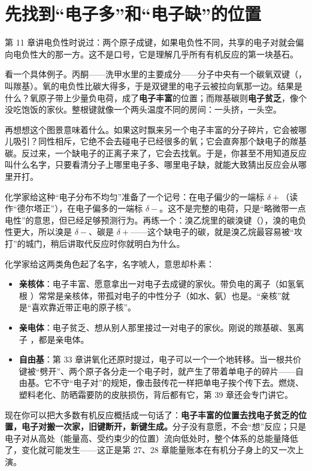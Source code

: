 \section{先找到“电子多”和“电子缺”的位置}

第 11 章讲电负性时说过：两个原子成键，如果电负性不同，共享的电子对就会偏向电负性大的那一方。这不是口号，它是理解几乎所有有机反应的第一块基石。

看一个具体例子。丙酮——洗甲水里的主要成分——分子中央有一个碳氧双键（，叫羰基）。氧的电负性比碳大得多，于是双键里的电子云被拉向氧那一边。结果是什么？氧原子带上少量负电荷，成了\textbf{电子丰富}的位置；而羰基碳则\textbf{电子贫乏}，像个没吃饱饭的家伙。整根键就像一个两头温度不同的房间：一头挤，一头空。

再想想这个图景意味着什么。如果这时飘来另一个电子丰富的分子碎片，它会被哪儿吸引？同性相斥，它绝不会去碰电子已经很多的氧；它会直奔那个缺电子的羰基碳。反过来，一个缺电子的正离子来了，它会去找氧。于是，你甚至不用知道反应叫什么名字，只要看清分子上哪里电子多、哪里电子缺，就能大致猜出反应会从哪里开打。

化学家给这种“电子分布不均匀”准备了一个记号：在电子偏少的一端标 $\delta+$（读作“德尔塔正”），在电子偏多的一端标 $\delta-$。这不是完整的电荷，只是“略微带一点电性”的意思，但已经足够预测行为。再练一个：溴乙烷里的碳溴键（），溴的电负性更大，所以溴是 $\delta-$、碳是 $\delta+$——这个缺电子的碳，就是溴乙烷最容易被“攻打”的城门，稍后讲取代反应时你就明白为什么。

化学家给这两类角色起了名字，名字唬人，意思却朴素：

\begin{itemize}[itemsep=2pt]
\item \textbf{亲核体}：电子丰富、愿意拿出一对电子去成键的家伙。带负电的离子（如氢氧根 ）常常是亲核体，带孤对电子的中性分子（如水、氨）也是。“亲核”就是“喜欢靠近带正电的原子核”。
\item \textbf{亲电体}：电子贫乏、想从别人那里接过一对电子的家伙。刚说的羰基碳、氢离子 ，都是亲电体。
\item \textbf{自由基}：第 33 章讲氧化还原时提过，电子可以一个一个地转移。当一根共价键被“劈开”、两个原子各分走一个电子时，就产生了带着单电子的碎片——自由基。它不守“电子对”的规矩，像击鼓传花一样把单电子挨个传下去。燃烧、塑料老化、防晒霜要防的皮肤损伤，背后都有它，第 39 章还会专门讲它。
\end{itemize}

现在你可以把大多数有机反应概括成一句话了：\textbf{电子丰富的位置去找电子贫乏的位置，电子对搬一次家，旧键断开，新键生成。}分子没有意愿，不会“想”反应；只是电子对从高处（能量高、受约束少的位置）流向低处时，整个体系的总能量降低了，变化就可能发生——这正是第 27、28 章能量账本在有机分子身上的又一次上演。

